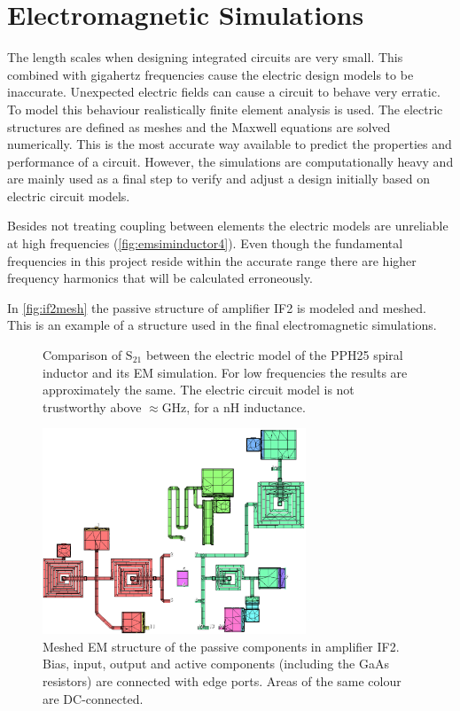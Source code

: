 \chapter{Electromagnetic Simulations}\label{app:emsim}
		The length scales when designing integrated circuits are very small. This combined with gigahertz frequencies cause the electric design models to be inaccurate. Unexpected electric fields can cause a circuit to behave very erratic. To model this behaviour realistically finite element analysis is used. The electric structures are defined as meshes and the Maxwell equations are solved numerically. This is the most accurate way available to predict the properties and performance of a circuit. However, the simulations are computationally heavy and are mainly used as a final step to verify and adjust a design initially based on electric circuit models.

		Besides not treating coupling between elements the electric models are unreliable at high frequencies (\autoref{fig:emsiminductor4}). Even though the fundamental frequencies in this project reside within the accurate range there are higher frequency harmonics that will be calculated erroneously.
		
		In \autoref{fig:if2mesh} the passive structure of amplifier IF2 is modeled and meshed. This is an example of a structure used in the final electromagnetic simulations.

		\begin{figure}[hpt!]
			\centering
			\caption[EM simulation of the UMS PPH25 spiral inductor.]{Comparison of S$_{21}$ between the electric model of the PPH25 spiral inductor and its EM simulation. For low frequencies the results are approximately the same. The electric circuit model is not trustworthy above $\approx$\unit[12]{GHz}, for a \unit[4]{nH} inductance.}\label{fig:emsiminductor4}
		\end{figure}

		\begin{figure}[hpt!]
			\centering
			\includegraphics[width=0.7\textwidth]{fig/emsim/if2mesh}
			\caption[EM mesh of amplifier IF2.]{Meshed EM structure of the passive components in amplifier IF2. Bias, input, output and active components (including the GaAs resistors) are connected with edge ports. Areas of the same colour are DC-connected.}\label{fig:if2mesh}
		\end{figure}